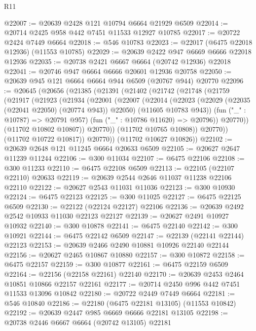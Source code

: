 \begin{lexlean}{R11}
\begin{coremodule}
@22007 := @20639 @2428 @121 @10794 @6664 @21929 @6509
@22014 := @20714 @2425 @958 @442 @7451 @11533 @12927 @10785
@22017 := @20722 @2424 @7449 @6664
@22018 := @546 @10783
@22023 := @22017 (@6475 @22018 @12936) (@11553 @10785)
@22029 := @20639 @2422 @947 @6669 @6666 @22018 @12936
@22035 := @20738 @2421 @6667 @6664 (@20742 @12936) @22018
@22041 := @20746 @947 @6664 @6666 @20601 @12936 @20758
@22050 := @20639 @945 @121 @6664 @6664 @944 @6509 (@20767 @944) @20770
@22096 := @20645
    (@20656
      (@21385
        (@21391
          (@21402
            (@21742
              (@21748
                (@21759
                  (@21917
                    (@21923
                      (@21934
                        (@22001
                          (@22007
                            (@22014
                              (@22023
                                (@22029 (@22035 (@22041 @22050) (@20774 @943)) @22050)
                                (@11605 @10783 @943))
                              (fun ("_" : @10787) => @20791 @957)
                              (fun ("_" : @10786 @11620) => @20796))
                            @20770))
                        (@11702 @10802 @10807))
                      @20770))
                  (@11702 @10765 @10808))
                @20770))
            (@11702 @10722 @10817))
          @20770))
      (@11702 @10627 @10826))
@22102 := @20639 @2648 @121 @11245 @6664 @20633 @6509
@22105 := @20627 @2647 @11239 @11244
@22106 := @300 @11034
@22107 := @6475 @22106
@22108 := @300 @11233
@22110 := @6475 @22108 @6509
@22113 := @22105 (@22107 @22110) @20633
@22119 := @20639 @2544 @2646 @11037 @11238 @22106 @22110
@22122 := @20627 @2543 @11031 @11036
@22123 := @300 @10930
@22124 := @6475 @22123
@22125 := @300 @11025
@22127 := @6475 @22125 @6509
@22130 := @22122 (@22124 @22127) @22106
@22136 := @20639 @2492 @2542 @10933 @11030 @22123 @22127
@22139 := @20627 @2491 @10927 @10932
@22140 := @300 @10878
@22141 := @6475 @22140
@22142 := @300 @10921
@22144 := @6475 @22142 @6509
@22147 := @22139 (@22141 @22144) @22123
@22153 := @20639 @2466 @2490 @10881 @10926 @22140 @22144
@22156 := @20627 @2465 @10867 @10880
@22157 := @300 @10872
@22158 := @6475 @22157
@22159 := @300 @10877
@22161 := @6475 @22159 @6509
@22164 := @22156 (@22158 @22161) @22140
@22170 := @20639 @2453 @2464 @10851 @10866 @22157 @22161
@22177 := @20714 @2450 @996 @442 @7451 @11533 @13096 @10842
@22180 := @20722 @2449 @7449 @6664
@22181 := @546 @10840
@22186 := @22180 (@6475 @22181 @13105) (@11553 @10842)
@22192 := @20639 @2447 @985 @6669 @6666 @22181 @13105
@22198 := @20738 @2446 @6667 @6664 (@20742 @13105) @22181

\end{coremodule}
\end{lexlean}
